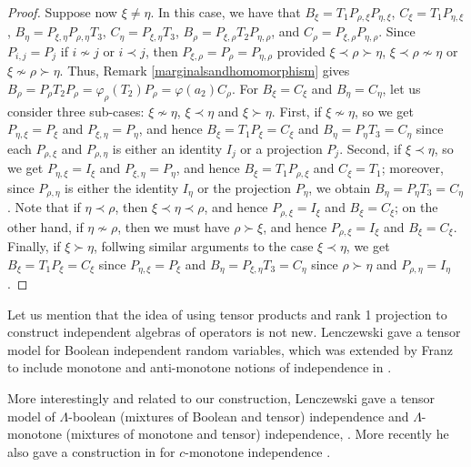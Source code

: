 \documentclass[a4paper,12pt]{extarticle}
\theoremstyle{definition}
\theoremstyle{remark}
\begin{document}
\begin{proof}
	
	Suppose now $\xi \neq \eta$. 
	In this case, we have that $B_\xi=T_1 P_{\rho,\xi}P_{\eta,\xi}$,  $C_\xi=T_1 P_{\eta,\xi}$,  $B_{\eta}=P_{\xi,\eta}P_{\rho,\eta}T_3$, $C_\eta=P_{\xi,\eta}T_3$, $B_\rho=P_{\xi,\rho}T_{2}P_{\eta,\rho}$, and $C_\rho=P_{\xi,\rho}P_{\eta,\rho}$.  
	Since $P_{i,j}=P_j$ if $i\nsim j$ or $i\prec j$, then $P_{\xi,\rho}=P_{\rho}=P_{\eta,\rho}$ provided $\xi \prec \rho \succ \eta$, $\xi \prec \rho \nsim \eta$ or $\xi \nsim \rho \succ \eta$. 
	Thus, Remark \ref{marginalsandhomomorphism} gives $B_\rho=P_\rho T_2 P_\rho=\varphi_{\rho}(T_2) P_\rho=\varphi(a_2)C_\rho$.  
	For $B_\xi=C_\xi$ and $B_\eta=C_{\eta}$, let us consider three sub-cases: $\xi \nsim \eta$, $\xi \prec \eta$ and $\xi \succ \eta$.  
	First, if $\xi \nsim \eta$,  so we get $P_{\eta,\xi}=P_\xi$ and $P_{\xi,\eta}=P_\eta$, and hence $B_\xi=T_1 P_\xi=C_\xi$ and $B_\eta=P_\eta T_3=C_\eta$ since  each $P_{\rho,\xi}$ and $P_{\rho,\eta}$ is either an identity $I_j$ or a projection $P_j$. 
	Second, if $\xi \prec \eta$,  so we get $P_{\eta,\xi}=I_\xi$ and $P_{\xi,\eta}=P_\eta$, and hence $B_\xi=T_1 P_{\rho,\xi}$ and $C_\xi=T_1$; moreover, since $P_{\rho,\eta}$ is either the identity $I_\eta$ or the projection $P_\eta$, we obtain $B_\eta=P_\eta T_3=C_\eta$. 
	Note that if $\eta \prec \rho$, then $\xi \prec \eta \prec  \rho$, and hence  $P_{\rho,\xi}=I_\xi$ and $B_\xi=C_\xi$;  
	on the other hand, if $\eta \nsim \rho$, then we must have $\rho \succ \xi$, and hence $P_{\rho,\xi}=I_\xi$ and $B_\xi=C_\xi$. 
	Finally, if $\xi\succ \eta$, follwing similar arguments to the case $\xi\prec \eta$, we get $B_\xi=T_1 P_\xi =C_\xi$ since $P_{\eta,\xi}=P_\xi$  and $B_{\eta}=P_{\xi,\eta} T_3 = C_\eta $ since $\rho \succ \eta$ and $P_{\rho,\eta} = I_\eta$. 
\end{proof}


Let us mention that the idea of using tensor products and rank 1 projection to construct independent algebras of operators is not new. 
 Lenczewski \cite{Len2019} gave a tensor model for Boolean independent random variables, which was extended by Franz to include monotone and anti-monotone notions of independence in  \cite{Franz}.

More interestingly and related to our construction,  Lenczewski  gave a tensor model of $\Lambda$-boolean (mixtures of Boolean and tensor) independence and $\Lambda$-monotone (mixtures of monotone and tensor) independence, \cite{Len1}.  More recently he also gave a construction in \cite{Len2019} for $c$-monotone independence \cite{Hase2011}.
\end{document}
